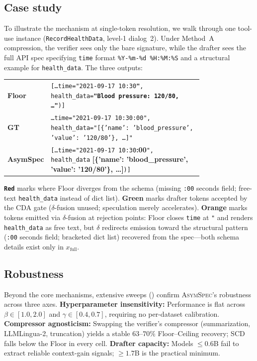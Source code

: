 \documentclass[11pt]{article}
\newcommand{\error}[1]{\textcolor{red!75!black}{\textbf{\texttt{#1}}}}
\newcommand{\accepted}[1]{\textcolor{acceptcol}{\textbf{#1}}}
\newcommand{\fused}[1]{\textcolor{fusecol}{\textbf{#1}}}
\theoremstyle{plain}
\theoremstyle{definition}
\begin{document}
\subsection{Case study}
\label{sec:apib-case}
To illustrate the mechanism at single-token resolution, we walk through one tool-use instance (\texttt{RecordHealthData}, level-1 dialog~2). Under Method~A compression, the verifier sees only the bare signature, while the drafter sees the full API spec specifying \texttt{time} format \texttt{\%Y-\%m-\%d~\%H:\%M:\%S} and a structural example for \texttt{health\_data}. The three outputs:
\begin{center}\footnotesize
\setlength{\tabcolsep}{4pt}
\renewcommand{\arraystretch}{1.15}
\begin{tabular}{@{}l p{0.78\linewidth}@{}}
\toprule
\textbf{Floor}    & \texttt{[\dots time="2021-09-17 10:30}\error{"}\texttt{, health\_data=}\error{"Blood pressure: 120/80, \dots"}\texttt{)]} \\
\textbf{GT}       & \texttt{\dots time="2021-09-17 10:30:00", health\_data="[\{'name': 'blood\_pressure', 'value': '120/80'\}, \dots]"} \\
\textbf{AsymSpec} & \texttt{[\dots time="2021-09-17 10:30}\accepted{:00}\texttt{", health\_data}\fused{ [}\accepted{\{'name': 'blood\_pressure', 'value': '120/80'\}, \dots}\fused{]}\texttt{)]} \\
\bottomrule
\end{tabular}
\end{center}
\noindent \error{Red} marks where Floor diverges from the schema (missing \texttt{:00} seconds field; free-text \texttt{health\_data} instead of dict list). \accepted{Green} marks drafter tokens accepted by the CDA gate ($\delta$-fusion unused; speculation merely accelerates). \fused{Orange} marks tokens emitted via $\delta$-fusion at rejection points: Floor closes \texttt{time} at \texttt{"} and renders \texttt{health\_data} as free text, but $\delta$ redirects emission toward the structural pattern (\texttt{:00} seconds field; bracketed dict list) recovered from the spec---both schema details exist only in $x_{\text{full}}$.

\subsection{Robustness}
\label{sec:ablation-robust}
Beyond the core mechanisms, extensive sweeps () confirm \textsc{AsymSpec}'s robustness across three axes. 
\textbf{Hyperparameter insensitivity:} Performance is flat across $\beta \in [1.0, 2.0]$ and $\gamma \in [0.4, 0.7]$, requiring no per-dataset calibration. 
\textbf{Compressor agnosticism:} Swapping the verifier's compressor (summarization, LLMLingua-2, truncation) yields a stable $63$--$70\%$ Floor--Ceiling recovery; SCD falls below the Floor in every cell. 
\textbf{Drafter capacity:} Models $\le 0.6$B fail to extract reliable context-gain signals; $\ge 1.7$B is the practical minimum.
\end{document}
